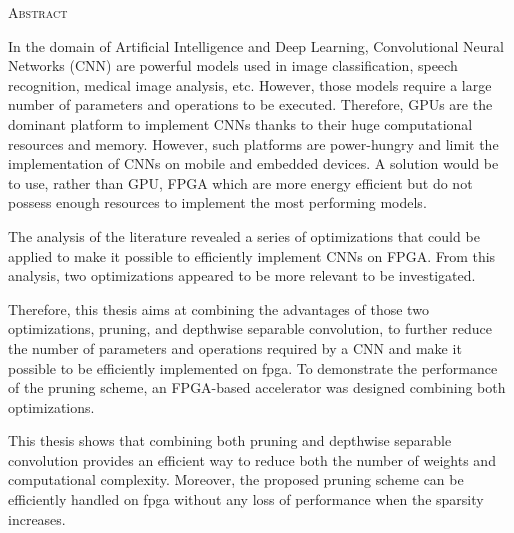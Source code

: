\vspace*{\fill}

    \begin{center}
    \huge{\textsc{Abstract}}
    \end{center}
    
    In the domain of Artificial Intelligence and Deep Learning, Convolutional Neural Networks (CNN) are powerful models used in image classification, speech recognition, medical image analysis, etc. However, those models require a large number of parameters and operations to be executed. Therefore, GPUs are the dominant platform to implement CNNs thanks to their huge computational resources and memory. However, such platforms are power-hungry and limit the implementation of CNNs on mobile and embedded devices. A solution would be to use, rather than GPU, FPGA which are more energy efficient but do not possess enough resources to implement the most performing models. 
    
    The analysis of the literature revealed a series of optimizations that could be applied to make it possible to efficiently implement CNNs on FPGA. From this analysis, two optimizations appeared to be more relevant to be investigated.

    Therefore, this thesis aims at combining the advantages of those two optimizations, pruning, and depthwise separable convolution, to further reduce the number of parameters and operations required by a CNN and make it possible to be efficiently implemented on \acrshort{fpga}.
    To demonstrate the performance of the pruning scheme, an FPGA-based accelerator was designed combining both optimizations.

    This thesis shows that combining both pruning and depthwise separable convolution provides an efficient way to reduce both the number of weights and computational complexity. Moreover, the proposed pruning scheme can be efficiently handled on \acrshort{fpga} without any loss of performance when the sparsity increases.

\vspace*{\fill}
\afterpage{\blankpage}
\newpage
